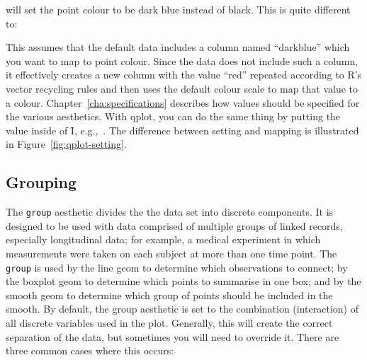 % 


\noindent will set the point colour to be dark blue instead of black.  This is quite different to:

% 



\noindent This assumes that the default data includes a column named ``darkblue'' which you want to map to point colour.  Since the data does not include such a column, it effectively creates a new column with the value ``red'' repeated according to R's vector recycling rules and then uses the default colour scale to map that value to a colour. Chapter~\ref{cha:specifications} describes how values should be specified for the various aesthetics.  With qplot, you can do the same thing by putting the value inside of \f{I}, e.g.,\ .  The difference between setting and mapping is illustrated in Figure~\ref{fig:qplot-setting}.  

% 


\subsection{Grouping}
\label{sub:grouping}


The {\tt group} aesthetic divides the the data set into discrete components. It is designed to be used with data comprised of multiple groups of linked records, especially longitudinal data; for example, a medical experiment in which measurements were taken on each subject at more than one time point.  The {\tt group} is used by the line geom to determine which observations to connect; by the boxplot geom to determine which points to summarise in one box; and by the smooth geom to determine which group of points should be included in the smooth. By default, the group aesthetic is set to the combination (interaction) of all discrete variables used in the plot.  Generally, this will create the correct separation of the data, but sometimes you will need to override it.  There are three common cases where this occurs:

